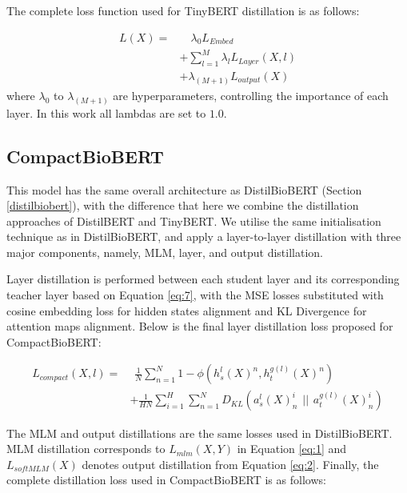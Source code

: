 \documentclass{article}
\begin{document}
The complete loss function used for TinyBERT distillation is as follows:

\begin{align}
    L(X) = & \hspace{12pt} \lambda_{0}L_{Embed} \\
           & + \sum_{l=1}^{M} \lambda_{l}L_{Layer}(X, l) \nonumber \\
           & + \lambda_{(M + 1)}L_{output}(X) \nonumber
\end{align}
where $\lambda_0$ to $\lambda_{(M + 1)}$ are hyperparameters, controlling the importance of each layer. In this work all lambdas are set to $1.0$.

\subsection{CompactBioBERT}
\label{compactbiobert} 

This model has the same overall architecture as DistilBioBERT (Section \ref{distilbiobert}), with the difference that here we combine the distillation approaches of DistilBERT and TinyBERT. We utilise the same initialisation technique as in DistilBioBERT, and apply a layer-to-layer distillation with three major components, namely, MLM, layer, and output distillation.

Layer distillation is performed between each student layer and its corresponding teacher layer based on Equation \ref{eq:7}, with the MSE losses substituted with cosine embedding loss for hidden states alignment and KL Divergence for attention maps alignment. Below is the final layer distillation loss proposed for CompactBioBERT:

\begin{align} 
    L_{compact}(X, l) =  & \hspace{5pt} \frac{1}{N} \sum_{n=1}^N 1 - \phi(h_s^l(X)^n , h_t^{g(l)}(X)^n)\\
                     & + \frac{1}{HN}\sum^H_{i=1} \sum^{N}_{n=1} D_{KL}(a_s^l(X)^i_n \hspace{5pt} || \hspace{5pt} a_t^{g(l)}(X)^i_n) \nonumber
\end{align}

The MLM and output distillations are the same losses used in DistilBioBERT. MLM distillation corresponds to $L_{mlm}(X, Y)$ in Equation \ref{eq:1} and $L_{softMLM}(X)$ denotes output distillation from Equation \ref{eq:2}. Finally, the complete distillation loss used in CompactBioBERT is as follows:
\end{document}
